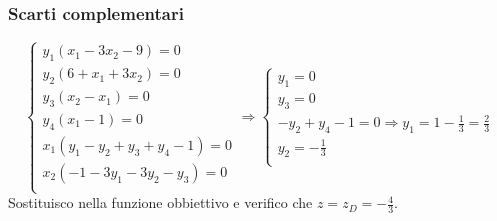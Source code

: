 \documentclass[\main/main.tex]{subfiles}
\begin{document}
\subsubsection*{Scarti complementari}
\[
  \begin{cases}
    y_1 (x_1 - 3x_2 - 9) = 0         \\
    y_2 (6 + x_1 + 3x_2) = 0         \\
    y_3 (x_2 - x_1) = 0              \\
    y_4 (x_1 -1) = 0                 \\
    x_1 (y_1 -y_2 + y_3 +y_4 -1) = 0 \\
    x_2 (-1-3y_1 - 3y_2 -y_3) = 0    \\
  \end{cases}
  \Rightarrow
  \begin{cases}
    y_1 = 0                                                         \\
    y_3 = 0                                                         \\
    -y_2 +y_4 -1 = 0 \Rightarrow y_1 = 1 -\frac{1}{3} = \frac{2}{3} \\
    y_2 = -\frac{1}{3}                                              \\
  \end{cases}
\]
Sostituisco nella funzione obbiettivo e verifico che $z = z_D = -\frac{4}{3}$.
\end{document}
